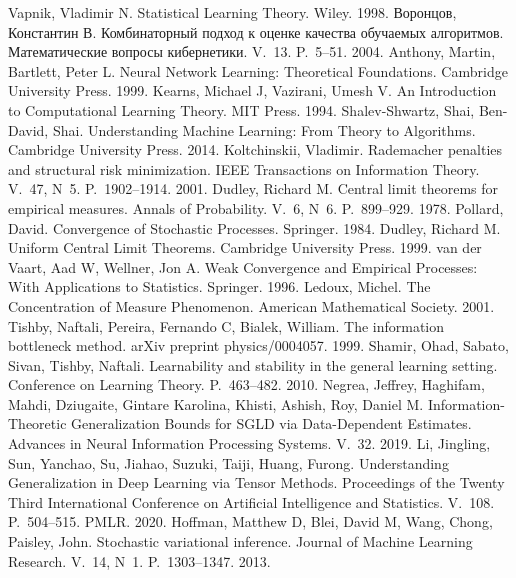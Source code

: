  Vapnik, Vladimir N. Statistical Learning Theory. Wiley. 1998.
 Воронцов, Константин В. Комбинаторный подход к оценке качества обучаемых алгоритмов. Математические вопросы кибернетики. V.~13. P.~5--51. 2004.
 Anthony, Martin, Bartlett, Peter L. Neural Network Learning: Theoretical Foundations. Cambridge University Press. 1999.
 Kearns, Michael J, Vazirani, Umesh V. An Introduction to Computational Learning Theory. MIT Press. 1994.
 Shalev-Shwartz, Shai, Ben-David, Shai. Understanding Machine Learning: From Theory to Algorithms. Cambridge University Press. 2014.
 Koltchinskii, Vladimir. Rademacher penalties and structural risk minimization. IEEE Transactions on Information Theory. V.~47, N~5. P.~1902--1914. 2001.
 Dudley, Richard M. Central limit theorems for empirical measures. Annals of Probability. V.~6, N~6. P.~899--929. 1978.
 Pollard, David. Convergence of Stochastic Processes. Springer. 1984.
 Dudley, Richard M. Uniform Central Limit Theorems. Cambridge University Press. 1999.
 van der Vaart, Aad W, Wellner, Jon A. Weak Convergence and Empirical Processes: With Applications to Statistics. Springer. 1996.
 Ledoux, Michel. The Concentration of Measure Phenomenon. American Mathematical Society. 2001.
 Tishby, Naftali, Pereira, Fernando C, Bialek, William. The information bottleneck method. arXiv preprint physics/0004057. 1999.
 Shamir, Ohad, Sabato, Sivan, Tishby, Naftali. Learnability and stability in the general learning setting. Conference on Learning Theory. P.~463--482. 2010.
 Negrea, Jeffrey, Haghifam, Mahdi, Dziugaite, Gintare Karolina, Khisti, Ashish, Roy, Daniel M. Information-Theoretic Generalization Bounds for SGLD via Data-Dependent Estimates. Advances in Neural Information Processing Systems. V.~32. 2019.
 Li, Jingling, Sun, Yanchao, Su, Jiahao, Suzuki, Taiji, Huang, Furong. Understanding Generalization in Deep Learning via Tensor Methods. Proceedings of the Twenty Third International Conference on Artificial Intelligence and Statistics. V.~108. P.~504--515. PMLR. 2020.
 Hoffman, Matthew D, Blei, David M, Wang, Chong, Paisley, John. Stochastic variational inference. Journal of Machine Learning Research. V.~14, N~1. P.~1303--1347. 2013.
